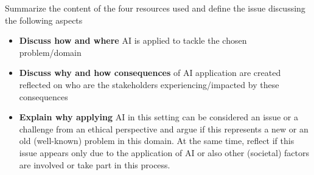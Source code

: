 \documentclass[11pt, a4paper]{article}
\begin{document}

Summarize the content of the four resources used and define the issue discussing the following aspects

\begin{itemize}
	\item \textbf{Discuss how and where} AI is applied to tackle the chosen problem/domain
	\item \textbf{Discuss why and how consequences} of AI application are created reflected on who are the stakeholders experiencing/impacted by these consequences
	\item \textbf{Explain why applying} AI in this setting can be considered an issue or a challenge from an ethical perspective and argue if this represents a new or an old (well-known) problem in this domain. At the same time, reflect if this issue appears only due to the application of AI or also other (societal) factors are involved or take part in this process.
\end{itemize}



\end{document}
